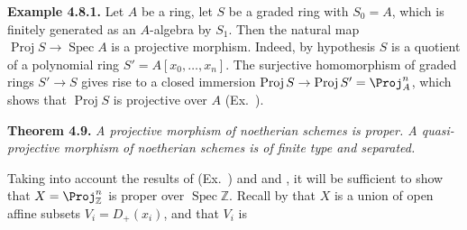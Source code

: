 {\smallskip
\noindent\hypertarget{result-II-4.8.1}{}\textbf{Example 4.8.1.} Let $A$ be a ring, let $S$ be a graded ring with $S_0=A$, which is finitely generated as an $A$-algebra by $S_1$. Then the natural map $\operatorname{Proj}S\to\operatorname{Spec}A$ is a projective morphism. Indeed, by hypothesis $S$ is a quotient of a polynomial ring $S'=A[x_0,\ldots,x_n]$. The surjective homomorphism of graded rings $S'\to S$ gives rise to a closed immersion $\operatorname{Proj}S\to\operatorname{Proj}S'=\Proj_A^n$, which shows that $\operatorname{Proj}S$ is projective over $A$ (Ex.~).

\medskip
\noindent\hypertarget{result-II-4.9}{}\textbf{Theorem 4.9.} \emph{A projective morphism of noetherian schemes is proper. A quasi-projective morphism of noetherian schemes is of finite type and separated.}

\Proof Taking into account the results of (Ex.~) and  and , it will be sufficient to show that $X=\Proj_{\mathbb Z}^n$ is proper over $\operatorname{Spec}\mathbb Z$. Recall by  that $X$ is a union of open affine subsets $V_i=D_+(x_i)$, and that $V_i$ is
}
